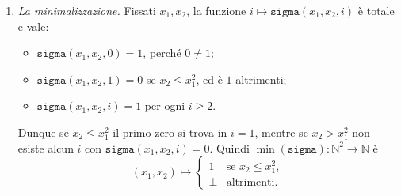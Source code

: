 \begin{sol}
\begin{enumerate}
    In termini di espressioni, usando le funzioni $C_{1,3}$ e $P_{3,k}$,
    \[
    \begin{aligned}
        \mathsf{SIGMA}=\mathsf{COMP}\Bigl(
        &\mathsf{CONCAT}\Bigl(\\
        &\quad\mathsf C_{1,3},\\
        &\quad\mathsf{COMP}\bigl(\mathsf{CONCAT}(\mathsf C_{1,3},\mathsf T),\mathsf{DIFF}\bigr)\\
        &\Bigr),\\
        &\mathsf{DIFF}\Bigr),
    \end{aligned}
    \]
    dove
    \[
    \begin{aligned}
        \mathsf{T}=\mathsf{COMP}\Bigl(
        &\mathsf{CONCAT}\Bigl(\\
        &\quad\mathsf{COMP}\Bigl(\\
        &\qquad\mathsf{CONCAT}\Bigl(\\
        &\qquad\quad\mathsf{COMP}\bigl(\mathsf{CONCAT}(\mathsf P_{3,2},\mathsf{COMP}(\mathsf{CONCAT}(\mathsf P_{3,1},\mathsf P_{3,1}),\mathsf{MULT})),\mathsf{DIFF}\bigr),\\
        &\qquad\quad\mathsf{COMP}\bigl(\mathsf{CONCAT}(\mathsf P_{3,3},\mathsf C_{1,3}),\mathsf{DIFF}\bigr)\\
        &\qquad\Bigr),\\
        &\qquad\mathsf{SUM}\\
        &\quad\Bigr),\\
        &\quad\mathsf{COMP}\bigl(\mathsf{CONCAT}(\mathsf C_{1,3},\mathsf P_{3,3}),\mathsf{DIFF}\bigr)\\
        &\Bigr),\\
        &\mathsf{SUM}\Bigr).
    \end{aligned}
    \]

    \item \emph{La minimalizzazione.} Fissati $x_1,x_2$, la funzione $i\mapsto\texttt{sigma}(x_1,x_2,i)$ è totale e vale:
    \begin{itemize}
        \item $\texttt{sigma}(x_1,x_2,0)=1$, perché $0\neq1$;
        \item $\texttt{sigma}(x_1,x_2,1)=0$ se $x_2\leq x_1^2$, ed è $1$ altrimenti;
        \item $\texttt{sigma}(x_1,x_2,i)=1$ per ogni $i\geq2$.
    \end{itemize}
    Dunque se $x_2\leq x_1^2$ il primo zero si trova in $i=1$, mentre se $x_2>x_1^2$ non esiste alcun $i$ con $\texttt{sigma}(x_1,x_2,i)=0$. Quindi $\min(\texttt{sigma})\colon\mathbb N^2\to\mathbb N$ è
    \[
        (x_1,x_2)\longmapsto
        \begin{cases}
            1 & \text{se } x_2\leq x_1^2,\\
            \bot & \text{altrimenti.}
        \end{cases}
    \]


\end{enumerate}
\end{sol}
